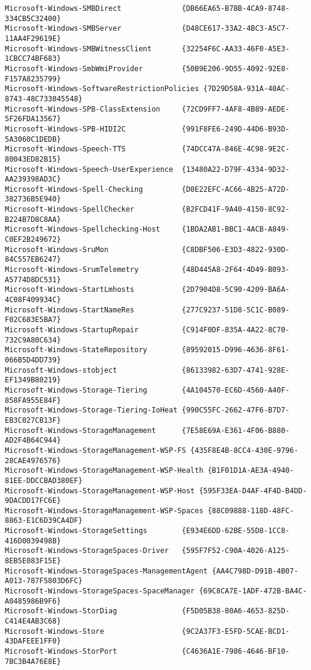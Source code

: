 \documentclass{report}
\begin{document}
\begin{lstlisting}[breaklines=true,basicstyle=\tiny]
Microsoft-Windows-SMBDirect              {DB66EA65-B7BB-4CA9-8748-334CB5C32400}
Microsoft-Windows-SMBServer              {D48CE617-33A2-4BC3-A5C7-11AA4F29619E}
Microsoft-Windows-SMBWitnessClient       {32254F6C-AA33-46F0-A5E3-1CBCC74BF683}
Microsoft-Windows-SmbWmiProvider         {50B9E206-9D55-4092-92E8-F157A8235799}
Microsoft-Windows-SoftwareRestrictionPolicies {7D29D58A-931A-40AC-8743-48C733045548}
Microsoft-Windows-SPB-ClassExtension     {72CD9FF7-4AF8-4B89-AEDE-5F26FDA13567}
Microsoft-Windows-SPB-HIDI2C             {991F8FE6-249D-44D6-B93D-5A3060C1DEDB}
Microsoft-Windows-Speech-TTS             {74DCC47A-846E-4C98-9E2C-80043ED82B15}
Microsoft-Windows-Speech-UserExperience  {13480A22-D79F-4334-9D32-AA239398AD3C}
Microsoft-Windows-Spell-Checking         {D0E22EFC-AC66-4B25-A72D-382736B5E940}
Microsoft-Windows-SpellChecker           {B2FCD41F-9A40-4150-8C92-B224B7D8C8AA}
Microsoft-Windows-Spellchecking-Host     {1BDA2AB1-BBC1-4ACB-A849-C0EF2B249672}
Microsoft-Windows-SruMon                 {C8DBF506-E3D3-4822-930D-84C557EB6247}
Microsoft-Windows-SrumTelemetry          {48D445A8-2F64-4D49-B093-A5774D8DC531}
Microsoft-Windows-StartLmhosts           {2D7904D8-5C90-4209-BA6A-4C08F409934C}
Microsoft-Windows-StartNameRes           {277C9237-51D8-5C1C-B089-F02C683E5BA7}
Microsoft-Windows-StartupRepair          {C914F0DF-835A-4A22-8C70-732C9A80C634}
Microsoft-Windows-StateRepository        {89592015-D996-4636-8F61-066B5D4DD739}
Microsoft-Windows-stobject               {86133982-63D7-4741-928E-EF1349B80219}
Microsoft-Windows-Storage-Tiering        {4A104570-EC6D-4560-A40F-858FA955E84F}
Microsoft-Windows-Storage-Tiering-IoHeat {990C55FC-2662-47F6-B7D7-EB3C027CB13F}
Microsoft-Windows-StorageManagement      {7E58E69A-E361-4F06-B880-AD2F4B64C944}
Microsoft-Windows-StorageManagement-WSP-FS {435F8E4B-8CC4-430E-9796-28CAE4976576}
Microsoft-Windows-StorageManagement-WSP-Health {B1F01D1A-AE3A-4940-81EE-DDCCBAD380EF}
Microsoft-Windows-StorageManagement-WSP-Host {595F33EA-D4AF-4F4D-B4DD-9DACDD17FC6E}
Microsoft-Windows-StorageManagement-WSP-Spaces {88C09888-118D-48FC-8863-E1C6D39CA4DF}
Microsoft-Windows-StorageSettings        {E934E6DD-62BE-55D8-1CC8-416D0039498B}
Microsoft-Windows-StorageSpaces-Driver   {595F7F52-C90A-4026-A125-8EB5E083F15E}
Microsoft-Windows-StorageSpaces-ManagementAgent {AA4C798D-D91B-4B07-A013-787F5803D6FC}
Microsoft-Windows-StorageSpaces-SpaceManager {69C8CA7E-1ADF-472B-BA4C-A0485986B9F6}
Microsoft-Windows-StorDiag               {F5D05B38-80A6-4653-825D-C414E4AB3C68}
Microsoft-Windows-Store                  {9C2A37F3-E5FD-5CAE-BCD1-43DAFEEE1FF0}
Microsoft-Windows-StorPort               {C4636A1E-7986-4646-BF10-7BC3B4A76E8E}

\end{lstlisting}
\end{document}
